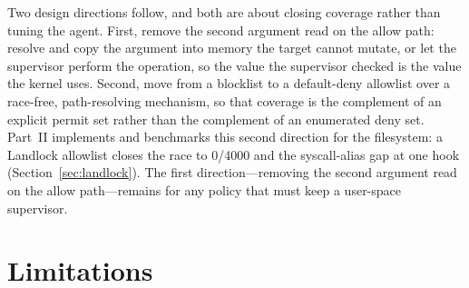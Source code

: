 \documentclass[11pt]{article}
\newcommand{\Nrace}{4000}
\begin{document}
Two design directions follow, and both are about closing coverage rather than tuning the agent. First,
remove the second argument read on the allow path: resolve and copy the argument into memory the target
cannot mutate, or let the supervisor perform the operation, so the value the supervisor checked is the
value the kernel uses. Second, move from a blocklist to a default-deny allowlist over a race-free,
path-resolving mechanism, so that coverage is the complement of an explicit permit set rather than the
complement of an enumerated deny set. Part~II implements and benchmarks this second direction for the
filesystem: a Landlock allowlist closes the race to 0/\Nrace{} and the syscall-alias gap at one hook
(Section~\ref{sec:landlock}). The first direction---removing the second argument read on the allow
path---remains for any policy that must keep a user-space supervisor.

\section{Limitations}\label{sec:limits}
\end{document}
